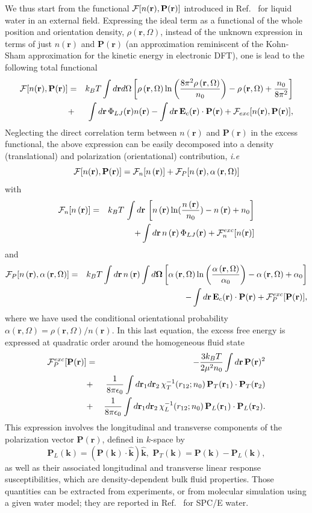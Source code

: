 \documentclass[aip,jcp,showpacs,amsmath,amssymb,superscriptaddress]{revtex4-1}
\newcommand{\be}{\begin{equation}}
\newcommand{\ee}{\end{equation}}
\newcommand{\bea}{\begin{eqnarray}}
\newcommand{\eea}{\end{eqnarray}}
\newcommand{\nn}{\nonumber}
\newcommand{\RR}{\mathbf{r}}
\newcommand{\rr}{\mathbf{r}}
\newcommand{\dr}{d\mathbf{r}}
\newcommand{\kk}{\mathbf{k}}
\newcommand{\rhon}{{n\left({\mathbf r}\right)}}
\newcommand{\rhorom}{{\rho\left({\mathbf r},\Omega\right)}}
\newcommand{\alpharom}{{\alpha\left({\mathbf r},\Omega\right)}}
\newcommand{\Om}{\mathbf{\Omega}}
\newcommand{\nr}{n(\mathbf{r})}
\newcommand{\F}{{\cal F}}
\newcommand{\Pol}{\mathbf{P}({\mathbf r})}
\newcommand{\PP}{\mathbf{P}}
\newcommand{\EE}{\mathbf{E}}
\begin{document}
We thus start from the functional  $\F[n(\rr),\Pol]$ introduced in Ref.~ for liquid water in an external field.  Expressing the ideal term as a functional of the whole position and orientation density, $\rho(\rr,\Omega)$, instead of the unknown expression in terms of just $n(\rr)$ and  $\PP(\rr)$ (an approximation reminiscent of the Kohn-Sham approximation for the kinetic energy in electronic DFT),  one is lead to the following total functional 
\bea
\label{eq:Ftot}
\F[n(\rr),\PP(\rr)] &=& k_BT \int d\rr d\Omega \left[ \rhorom \ln \left(\frac{8\pi^2 \rhorom}{n_0} \right) - \rhorom+\frac{n_0}{8\pi^2} \right] \nn \\
& + &   \int \dr \, \Phi_{LJ}(\rr) n(\rr) - \int \dr \, \EE_c(\rr) \cdot \PP(\rr) + \F_{exc}[n(\rr),\PP(\rr)],
\eea
Neglecting the direct correlation term between $\nr$ and $\Pol$ in the excess functional, the above expression can be easily decomposed into a density (translational) and polarization (orientational) contribution, {\em i.e}
\be
  \F[n(\rr),\PP(\rr)] = \F_n[\rhon] + \F_P[\rhon,\alpharom]
  \label{eq:Fn+FP}
\ee
with
\bea
\F_n[\rhon] &= &k_BT \,\int d\RR \,  \left[ \rhon \ln(\frac{\rhon}{n_0})-\rhon+n_0 \right]  \nn \\
& & + \int d\rr\, \rhon \,  \Phi_{LJ}(\rr) + \F_n^{exc}[n(\rr)]   \label{eq:Fn}
\eea
and
\bea
\F_P[\rhon,\alpharom] &=& k_BT \int d\rr  \, \rhon \int d\Om \left[ \alpharom \ln \left(\frac{\alpharom}{\alpha_0} \right)  - \alpharom + \alpha_0 \right] \nn \\
& &  - \int \dr \, \EE_c(\rr) \cdot \PP(\rr) + \F_P^{exc}[\Pol], 
\label{eq:FP}
\eea
where we have used  the conditional orientational probability $\alpharom = \rhorom/\rhon$. In this last equation, the excess free energy is expressed at quadratic order around the homogeneous fluid state
\bea
\F_P^{exc}[\Pol] &= & -  \frac{3k_BT}{2\mu^2 n_0}  \int d\rr \, \Pol^2\nn \\
&+&      \frac{1}{8\pi \epsilon_0} \int d\rr_1 d\rr_2 \, \chi_T^{-1}(r_{12};n_0) \, \PP_T(\rr_1) \cdot \PP_T(\rr_2)  \nn \\
&+&    \frac{1}{8\pi \epsilon_0} \int d\rr_1 d\rr_2 \, \chi_L^{-1}(r_{12};n_0) \, \PP_L(\rr_1) \cdot \PP_L(\rr_2).  
\label{eq:FP_exc}
\eea
This expression involves the longitudinal and transverse components of the polarization vector $\Pol$, defined in $k$-space by
\be
\PP_L(\kk) = \left(\PP(\kk) \cdot \hat{\kk}\right)  \hat{\kk}, \,  \, \PP_T(\kk) = \PP(\kk) - \PP_L(\kk),
\label{eq:P_L_T}
\ee
as well as their associated longitudinal and transverse linear response susceptibilities, which are density-dependent bulk fluid properties. Those quantities can be extracted from experiments, or from molecular simulation using a given water model; they are reported in 
Ref.~ for SPC/E water.
\end{document}
